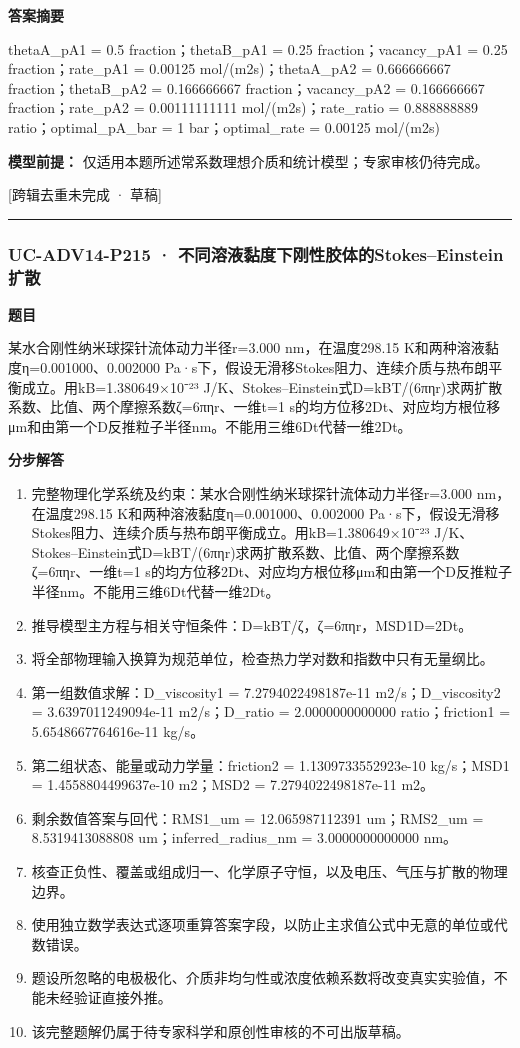 \documentclass[UTF8,11pt,a4paper]{ctexart}
\begin{document}
\noindent\textbf{答案摘要}\par
thetaA\_pA1 = 0.5 fraction；thetaB\_pA1 = 0.25 fraction；vacancy\_pA1 = 0.25 fraction；rate\_pA1 = 0.00125 mol/(m2s)；thetaA\_pA2 = 0.666666667 fraction；thetaB\_pA2 = 0.166666667 fraction；vacancy\_pA2 = 0.166666667 fraction；rate\_pA2 = 0.00111111111 mol/(m2s)；rate\_ratio = 0.888888889 ratio；optimal\_pA\_bar = 1 bar；optimal\_rate = 0.00125 mol/(m2s)\par
\noindent\textbf{模型前提：}
仅适用本题所述常系数理想介质和统计模型；专家审核仍待完成。\par
\noindent\textcolor{red!65!black}{[跨辑去重未完成 · 草稿]} \par
\medskip\hrule\medskip
{}
\subsubsection*{UC-ADV14-P215 · 不同溶液黏度下刚性胶体的Stokes–Einstein扩散}
\noindent\textbf{题目}\par
某水合刚性纳米球探针流体动力半径r=3.000 nm，在温度298.15 K和两种溶液黏度η=0.001000、0.002000 Pa·s下，假设无滑移Stokes阻力、连续介质与热布朗平衡成立。用kB=1.380649×10⁻²³ J/K、Stokes–Einstein式D=kBT/(6πηr)求两扩散系数、比值、两个摩擦系数ζ=6πηr、一维t=1 s的均方位移2Dt、对应均方根位移μm和由第一个D反推粒子半径nm。不能用三维6Dt代替一维2Dt。\par
\medskip\noindent\textbf{分步解答}
\begin{enumerate}
\item 完整物理化学系统及约束：某水合刚性纳米球探针流体动力半径r=3.000 nm，在温度298.15 K和两种溶液黏度η=0.001000、0.002000 Pa·s下，假设无滑移Stokes阻力、连续介质与热布朗平衡成立。用kB=1.380649×10⁻²³ J/K、Stokes–Einstein式D=kBT/(6πηr)求两扩散系数、比值、两个摩擦系数ζ=6πηr、一维t=1 s的均方位移2Dt、对应均方根位移μm和由第一个D反推粒子半径nm。不能用三维6Dt代替一维2Dt。
\item 推导模型主方程与相关守恒条件：D=kBT/ζ，ζ=6πηr，MSD1D=2Dt。
\item 将全部物理输入换算为规范单位，检查热力学对数和指数中只有无量纲比。
\item 第一组数值求解：D\_viscosity1 = 7.2794022498187e-11 m2/s；D\_viscosity2 = 3.6397011249094e-11 m2/s；D\_ratio = 2.0000000000000 ratio；friction1 = 5.6548667764616e-11 kg/s。
\item 第二组状态、能量或动力学量：friction2 = 1.1309733552923e-10 kg/s；MSD1 = 1.4558804499637e-10 m2；MSD2 = 7.2794022498187e-11 m2。
\item 剩余数值答案与回代：RMS1\_um = 12.065987112391 um；RMS2\_um = 8.5319413088808 um；inferred\_radius\_nm = 3.0000000000000 nm。
\item 核查正负性、覆盖或组成归一、化学原子守恒，以及电压、气压与扩散的物理边界。
\item 使用独立数学表达式逐项重算答案字段，以防止主求值公式中无意的单位或代数错误。
\item 题设所忽略的电极极化、介质非均匀性或浓度依赖系数将改变真实实验值，不能未经验证直接外推。
\item 该完整题解仍属于待专家科学和原创性审核的不可出版草稿。
\end{enumerate}
\end{document}

